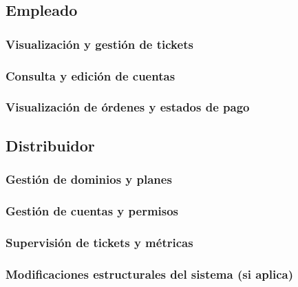 \subsection{Empleado}
\subsubsection{Visualización y gestión de tickets }
\subsubsection{Consulta y edición de cuentas }
\subsubsection{Visualización de órdenes y estados de pago}

\subsection{Distribuidor}
\subsubsection{Gestión de dominios y planes}
\subsubsection{Gestión de cuentas y permisos}
\subsubsection{Supervisión de tickets y métricas}
\subsubsection{Modificaciones estructurales del sistema (si aplica)}
